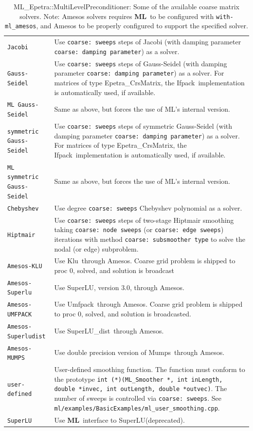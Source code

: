 \documentclass{article}[11pt]
\newcommand{\ML}     {{\bf ML}}
\newcommand{\amesos}  {{\sc Amesos}}
\newcommand{\umfpack}  {{\sc Umfpack}}
\newcommand{\superlu}  {{\sc SuperLU}}
\newcommand{\superludist}  {{\sc SuperLU\_dist}}
\newcommand{\mumps}  {{\sc Mumps}}
\newcommand{\klu}  {{\sc Klu}}
\newcommand{\ifpack}  {{\sc Ifpack}}
\begin{document}
\begin{table}[tbh]
\begin{center}
\begin{tabular}{ | p{4.5cm} | p{10cm} | }
\hline
\verb!Jacobi! & Use {\tt coarse: sweeps} steps of Jacobi (with damping
parameter {\tt coarse: damping parameter}) as a solver. \\
\verb!Gauss-Seidel! & Use  {\tt coarse: sweeps} steps of Gauss-Seidel (with
damping parameter {\tt coarse: damping parameter}) as a solver.
For matrices of type Epetra\_CrsMatrix, the \ifpack\
implementation is automatically used, if available. \\
\verb!ML Gauss-Seidel! & Same as above, but forces the use of ML's
internal version.\\
\verb!symmetric Gauss-Seidel! & Use  {\tt coarse: sweeps} steps of symmetric
Gauss-Seidel (with damping parameter {\tt coarse: damping parameter}) as a
 solver.  For matrices of type Epetra\_CrsMatrix, the \ifpack\
implementation is automatically used, if available. \\
\verb!ML symmetric Gauss-Seidel! & Same as above, but forces the use of ML's
internal version.\\
\verb!Chebyshev! & Use degree {\tt coarse: sweeps} Chebyshev polynomial
             as a solver. \\
\verb!Hiptmair! & Use {\tt coarse: sweeps} steps of two-stage Hiptmair
             smoothing taking {\tt coarse: node sweeps} 
             (or {\tt coarse: edge sweeps}) iterations with method
             {\tt coarse: subsmoother type} to solve the nodal (or edge) subproblem.\\
\verb!Amesos-KLU! & Use \klu\ through \amesos. Coarse grid problem is shipped to
 proc 0, solved, and solution is broadcast \\
\verb!Amesos-Superlu! & Use \superlu, version $3.0$, through \amesos. \\
\verb!Amesos-UMFPACK! & Use \umfpack\ through \amesos. Coarse grid problem is shipped to
 proc 0, solved, and solution is broadcasted. \\
\verb!Amesos-Superludist! & Use \superludist\ through \amesos. \\
\verb!Amesos-MUMPS! & Use double precision version of \mumps~through
\amesos. \\
\verb!user-defined! & User-defined smoothing function.  The function must conform to
the prototype {\tt int (*)(ML\_Smoother *, int inLength, double *invec, int outLength,
 double *outvec)}. The number of sweeps is controlled via {\tt coarse: sweeps}. See
{\tt ml/examples/BasicExamples/ml\_user\_smoothing.cpp}.\\
\verb!SuperLU! & Use \ML\ interface to \superlu (deprecated). \\
\hline
\end{tabular}
\caption{ML\_Epetra::MultiLevelPreconditioner: Some of the available coarse
matrix solvers. Note: Amesos solvers requires 
  \ML\ to be configured with {\tt with-ml\_amesos}, and Amesos to be
  properly configured to support the specified solver.}
\label{tab:ml:coarse}
\end{center}
\end{table}
\end{document}
